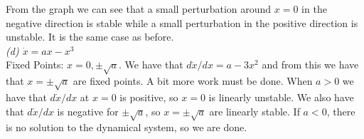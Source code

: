 \documentclass[12pt]{article}
\theoremstyle{remark}
\begin{document}
From the graph we can see that a small perturbation around $x=0$ in the negative direction is stable while a small perturbation in the positive direction is unstable. It is the same case as before. \\

\textit{(d) $\dot{x} = ax - x^3$} \\

Fixed Points: $x = 0, \pm \sqrt{a}$. We have that $d\dot{x}/dx = a - 3x^2$ and from this we have that $x = \pm\sqrt{a}$ are fixed points. A bit more work must be done. When $a>0$ we have that $d\dot{x}/dx$ at $x=0$ is positive, so $x=0$ is linearly unstable. We also have that $d\dot{x}/dx$ is negative for $\pm\sqrt{a}$, so $x=\pm\sqrt{a}$ are linearly stable. If $a < 0$, there is no solution to the dynamical system, so we are done.
\end{document}
